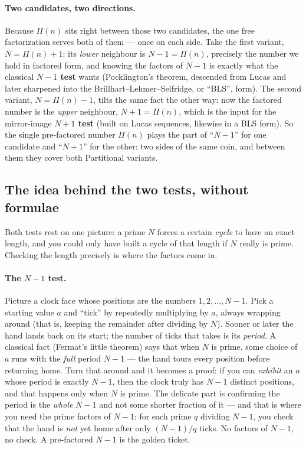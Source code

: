 \documentclass[11pt,a4paper]{article}
\newcommand{\Part}{\Pi}                 %
\begin{document}
\paragraph{Two candidates, two directions.}
Because $\Part(n)$ sits right between those two candidates, the one free
factorization serves both of them --- once on each side. Take the first variant,
$N=\Part(n)+1$: its \emph{lower} neighbour is $N-1=\Part(n)$, precisely the
number we hold in factored form, and knowing the factors of $N-1$ is exactly what
the classical \textbf{$N-1$ test} wants (Pocklington's theorem, descended from
Lucas and later sharpened into the Brillhart--Lehmer--Selfridge, or ``BLS'',
form). The second variant, $N=\Part(n)-1$, tilts the same fact the other way: now
the factored number is the \emph{upper} neighbour, $N+1=\Part(n)$, which is the
input for the mirror-image \textbf{$N+1$ test} (built on Lucas sequences, likewise
in a BLS form). So the single pre-factored number $\Part(n)$ plays the part of
``$N-1$'' for one candidate and ``$N+1$'' for the other: two sides of the same
coin, and between them they cover both Partitional variants.

\subsection*{The idea behind the two tests, without formulae}

Both tests rest on one picture: a prime $N$ forces a certain \emph{cycle} to have
an exact length, and you could only have built a cycle of that length if $N$
really is prime. Checking the length precisely is where the factors come in.

\paragraph{The $N-1$ test.}
Picture a clock face whose positions are the numbers $1,2,\dots,N-1$. Pick a
starting value $a$ and ``tick'' by repeatedly multiplying by $a$, always wrapping
around (that is, keeping the remainder after dividing by $N$). Sooner or later
the hand lands back on its start; the number of ticks that takes is its
\emph{period}. A classical fact (Fermat's little theorem) says that when $N$ is
prime, some choice of $a$ runs with the \emph{full} period $N-1$ --- the hand
tours every position before returning home. Turn that around and it becomes a
proof: if you can \emph{exhibit} an $a$ whose period is exactly $N-1$, then the
clock truly has $N-1$ distinct positions, and that happens only when $N$ is
prime. The delicate part is confirming the period is the \emph{whole} $N-1$ and
not some shorter fraction of it --- and that is where you need the prime factors
of $N-1$: for each prime $q$ dividing $N-1$, you check that the hand is \emph{not}
yet home after only $(N-1)/q$ ticks. No factors of $N-1$, no check. A
pre-factored $N-1$ is the golden ticket.
\end{document}
